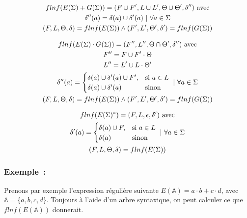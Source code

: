 \documentclass[12pt]{article}
\begin{document}
\begin{gather}
    flnf(E(\Sigma) + G(\Sigma)) = (F \cup F', L \cup L', \Theta \cup \Theta', \delta'')~ \text{avec} \\
    \delta''(a) = \delta(a) \cup \delta'(a) ~|~ \forall a \in \Sigma \notag \\
    (F, L, \Theta, \delta) = flnf(E(\Sigma)) \land (F', L', \Theta', \delta') = flnf(G(\Sigma)) \notag
\end{gather}

\begin{gather}
    flnf(E(\Sigma) \cdot G(\Sigma)) = (F'', L'', \Theta \cap \Theta', \delta'')~ \text{avec} \\
    F'' = F \cup F' \cdot \Theta \notag \\
    L'' = L' \cup L \cdot \Theta' \notag \\
    \delta''(a) = \begin{cases} \delta(a) \cup \delta'(a) \cup F', & \text{si}~ a \in L \\ \delta(a) \cup \delta'(a) & \text{sinon}\end{cases} ~|~ \forall a \in \Sigma\notag \\
    (F, L, \Theta, \delta) = flnf(E(\Sigma)) \land (F', L', \Theta', \delta') = flnf(G(\Sigma)) \notag
\end{gather}

\begin{gather}
    flnf(E(\Sigma)^*) = (F, L, \epsilon, \delta')~ \text{avec} \\
    \delta'(a) = \begin{cases} \delta(a) \cup F, & \text{si}~ a \in L \\ \delta(a) & \text{sinon}\end{cases} ~|~ \forall a \in \Sigma\notag \\
    (F, L, \Theta, \delta) = flnf(E(\Sigma)) \notag
\end{gather}

\subsubsection*{Exemple~:}

Prenons par exemple l'expression régulière suivante \(E(\mathbb{A}) = a \cdot b
+ c \cdot d\), avec \(\mathbb{A} = \{a, b, c, d\}\). Toujours à l'aide d'un
arbre syntaxique, on peut calculer ce que \(flnf(E(\mathbb{A}))\) donnerait.
\end{document}
